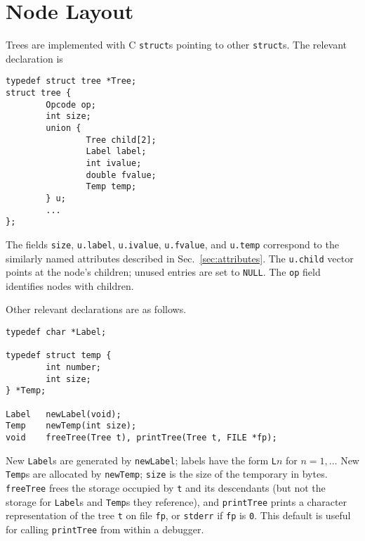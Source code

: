 \section{Node Layout}\label{sec:layout} 

Trees are implemented with C \verb|struct|s pointing to other \verb|struct|s.
The relevant declaration is
\begin{verbatim}
typedef struct tree *Tree;
struct tree {
        Opcode op;
        int size;
        union {
                Tree child[2];
                Label label;
                int ivalue;
                double fvalue;
                Temp temp;
        } u;
        ...
};
\end{verbatim}
The fields \verb|size|, \verb|u.label|, \verb|u.ivalue|, \verb|u.fvalue|,
and \verb|u.temp| correspond to the similarly named attributes
described in Sec.~\ref{sec:attributes}.
The \verb|u.child| vector points at the node's children; unused entries
are set to \verb|NULL|.
The \verb|op| field identifies nodes with children.

Other relevant declarations are as follows.
\begin{verbatim}
typedef char *Label;

typedef struct temp {
        int number;
        int size;
} *Temp;

Label   newLabel(void);
Temp    newTemp(int size);
void    freeTree(Tree t), printTree(Tree t, FILE *fp);
\end{verbatim}
New \verb|Label|s are generated by \verb|newLabel|; labels
have the form \verb|L|$n$ for $n = 1, \dots$
New \verb|Temp|s are allocated by \verb|newTemp|;
\verb|size| is the size of the temporary in bytes.
\verb|freeTree| frees the storage occupied by \verb|t| and its descendants
(but not the storage for \verb|Label|s and \verb|Temp|s they reference), and
\verb|printTree| prints a character representation
of the tree \verb|t| on file \verb|fp|, or \verb|stderr| if \verb|fp| is \verb|0|.
This default is useful for calling \verb|printTree| from within a debugger.


